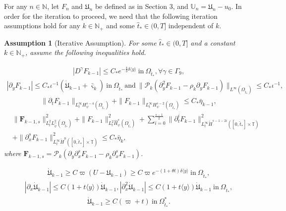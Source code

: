\documentclass{amsart}
\numberwithin{equation}{section}
\newtheorem{assumption}{Assumption}[section]
\newcommand\y{{{\langle y \rangle}}}
\begin{document}
For any $n\in\mathbb{N}$, let $F_{n}$ and $\mathfrak{U}_{n}$ be defined as in Section 3, and $\mathbb{U}_{n}=\mathfrak{U}_{n}-u_{0}$. In order for the iteration to proceed, we need that the following iteration assumptions hold for any $k\in\mathbb{N}_{+}$ and some $\hat{t}_{*}\in(0,T]$ independent of $k$.

\begin{assumption}[Iterative Assumption]\label{IA}
For some $\hat{t}_{*}\in(0,T]$ and a constant $k\in\mathbb{N}_{+}$, assume the following inequalities hold.

\begin{align}\label{ITA0}
|D^{\gamma}F_{k-1}|\leq C_{*}e^{-\frac{4}{3}\delta\y}~\text{in}~\Omega_{\hat{t}_{*}}, \forall \gamma\in\Gamma_{9},
\end{align}
\begin{align}\label{ITA1}
|\partial_{y}F_{k-1}|\leq C_{*}\iota^{-1}(\dot{\mathfrak{U}}_{k-1}+\bar{\varsigma}_{k})~\text{in}~\Omega_{\hat{t}_{*}}~\text{and}~
\|\mathcal{P}_{k}(\partial_{y}^{2}F_{k-1}-\rho_{k}\partial_{y}F_{k-1})\|_{L^{\infty}(\Omega_{\hat{t}_{*}})}\leq C_{*}\iota^{-1},
\end{align}
\begin{align}\label{ITA2}
\|\partial_{t}F_{k-1}\|_{L_{t}^{\infty}H_{\psi}^{s-4}(\Omega_{\hat{t}_{*}})}+\|F_{k-1}\|_{L_{t}^{\infty}H_{\psi}^{s-2}(\Omega_{\hat{t}_{*}})}
\leq C_{*}\bar{\eta}_{k-1},
\end{align}
\begin{align}\label{ITA3}
&\|\mathbf{F}_{k-1,s}\|_{L_{t}^{2}L_{\hat{\psi}}^{2}(\Omega_{\hat{t}_{*}})}^{2}
+\|F_{k-1}\|_{L_{t}^{2}\hat{H}_{\psi}^{s}(\Omega_{\hat{t}_{*}})}^{2}
+\sum_{i=0}^{\frac{s-1}{2}}\|\partial_{t}^{i}F_{k-1}\|_{L_{t}^{\infty}\mathring{H}^{s-1-2i}([0,\hat{t}_{*}]\times\mathbb{T})}^{2}\\
&+\|\partial_{x}^{s}F_{k-1}\|_{L_{t}^{\infty}\mathring{H}^{0}([0,\hat{t}_{*}]\times\mathbb{T})}^{2}
\leq C_{*}\bar{\eta}_{k},\nonumber
\end{align}
where $\mathbf{F}_{k-1,s}=\mathcal{P}_{k}\left(\partial_{y}\partial_{x}^{s}F_{k-1}-\rho_{k}\partial_{x}^{s}F_{k-1}\right)$.

\begin{align}\label{ITA4}
\dot{\mathfrak{U}}_{k-1}\geq C\varpi(U-\mathfrak{U}_{k-1})\geq C\varpi e^{-(1+\theta t)\delta\y}~\text{in}~\Omega_{\hat{t}_{*}},
\end{align}
\begin{align}\label{ITA5}
|\partial_{x}\dot{\mathfrak{U}}_{k-1}|\leq C(1+t\y)\dot{\mathfrak{U}}_{k-1}, |\partial_{x}^{2}\dot{\mathfrak{U}}_{k-1}|\leq C(1+t\y)\dot{\mathfrak{U}}_{k-1}~\text{in}~\Omega_{\hat{t}_{*}},
\end{align}
\begin{align}\label{ITA6}
\dot{\mathfrak{U}}_{k-1}\geq C(\varpi+t)~\text{in}~\Omega_{\hat{t}_{*}}^{*}.
\end{align}


\end{assumption}
\end{document}
